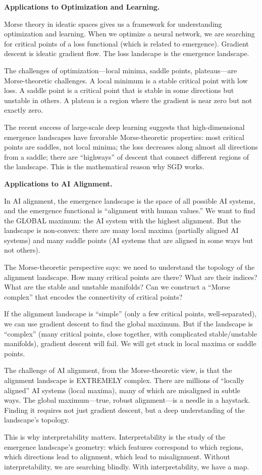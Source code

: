 \begin{interpretation}
\textbf{Applications to Optimization and Learning.}

Morse theory in ideatic spaces gives us a framework for understanding optimization
and learning. When we optimize a neural network, we are searching for critical
points of a loss functional (which is related to emergence). Gradient descent
is ideatic gradient flow. The loss landscape is the emergence landscape.

The challenges of optimization---local minima, saddle points, plateaus---are
Morse-theoretic challenges. A local minimum is a stable critical point with low
loss. A saddle point is a critical point that is stable in some directions but
unstable in others. A plateau is a region where the gradient is near zero but
not exactly zero.

The recent success of large-scale deep learning suggests that high-dimensional
emergence landscapes have favorable Morse-theoretic properties: most critical
points are saddles, not local minima; the loss decreases along almost all
directions from a saddle; there are ``highways'' of descent that connect different
regions of the landscape. This is the mathematical reason why SGD works.

\textbf{Applications to AI Alignment.}

In AI alignment, the emergence landscape is the space of all possible AI systems,
and the emergence functional is ``alignment with human values.'' We want to find
the GLOBAL maximum: the AI system with the highest alignment. But the landscape
is non-convex: there are many local maxima (partially aligned AI systems) and
many saddle points (AI systems that are aligned in some ways but not others).

The Morse-theoretic perspective says: we need to understand the topology of the
alignment landscape. How many critical points are there? What are their indices?
What are the stable and unstable manifolds? Can we construct a ``Morse complex''
that encodes the connectivity of critical points?

If the alignment landscape is ``simple'' (only a few critical points, well-separated),
we can use gradient descent to find the global maximum. But if the landscape is
``complex'' (many critical points, close together, with complicated stable/unstable
manifolds), gradient descent will fail. We will get stuck in local maxima or
saddle points.

The challenge of AI alignment, from the Morse-theoretic view, is that the alignment
landscape is EXTREMELY complex. There are millions of ``locally aligned'' AI
systems (local maxima), many of which are misaligned in subtle ways. The global
maximum---true, robust alignment---is a needle in a haystack. Finding it requires
not just gradient descent, but a deep understanding of the landscape's topology.

This is why interpretability matters. Interpretability is the study of the
emergence landscape's geometry: which features correspond to which regions, which
directions lead to alignment, which lead to misalignment. Without interpretability,
we are searching blindly. With interpretability, we have a map.
\end{interpretation}


